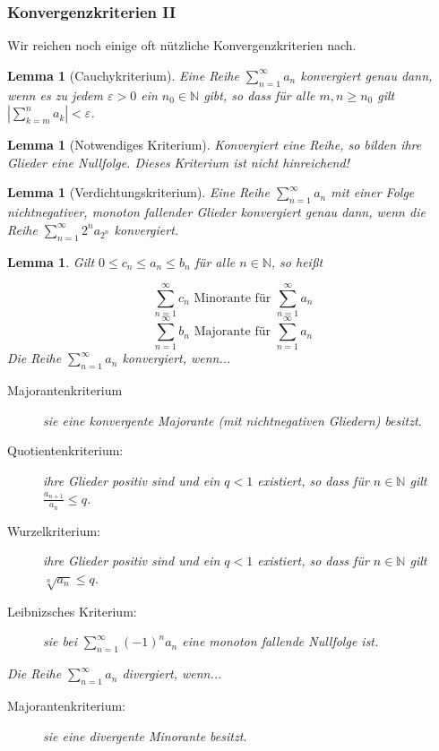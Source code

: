 \documentclass[fontsize=12pt,paper=a4,twoside,bibtotoc,idxtotoc,
liststotoc,pagesize,BCOR1.2cm,DIV15,chapterprefix,pagesize=pdftex]{scrbook}
\theoremstyle{plain}
\newtheorem{lm}[equation]{Lemma}
\theoremstyle{definition}
\theoremstyle{remark}
\begin{document}
\subsubsection{Konvergenzkriterien II}
Wir reichen noch einige oft nützliche Konvergenzkriterien nach.\\
\begin{lm}[Cauchykriterium]
Eine Reihe $\sum_{n=1}^\infty a_n$ konvergiert
                  genau dann, wenn es zu jedem $\varepsilon>0$ ein $n_0
                  \in \mathbb{N}$ gibt, so dass für alle $m,n \geq n_0$
                  gilt $| \sum_{k=m}^n a_k|<\varepsilon$.
\end{lm}
\begin{lm}[Notwendiges Kriterium] Konvergiert eine Reihe, so bilden ihre Glieder eine Nullfolge. Dieses Kriterium ist nicht hinreichend!
\end{lm}
\begin{lm}[Verdichtungskriterium] Eine Reihe $\sum_{n=1}^\infty a_n$ mit
                  einer Folge nichtnegativer, monoton fallender
                  Glieder konvergiert genau dann, wenn die Reihe
                  $\sum_{n=1}^\infty 2^n a_{2^n}$ konvergiert.
\end{lm}
\begin{lm} Gilt $0 \leq c_n \leq a_n \leq b_n$ für alle $n \in \mathbb{N}$, so heißt 

\[\sum_{n=1}^\infty c_n \text{ Minorante für } \sum_{n=1}^\infty a_n\] 
\[\sum_{n=1}^\infty b_n \text{ Majorante für } \sum_{n=1}^\infty a_n\]
Die Reihe $\sum_{n=1}^\infty a_n$ konvergiert, wenn...
\begin{description}
\item[Majorantenkriterium] sie eine konvergente Majorante (mit nichtnegativen Gliedern) besitzt.
\item[Quotientenkriterium:] ihre Glieder positiv sind und ein $q<1$
existiert, so dass für $n \in \mathbb{N}$ gilt $\frac{a_{n+1}}{a_n}
\leq q$. 
\item[Wurzelkriterium:] ihre Glieder positiv sind und ein $q<1$
existiert, so dass für $n \in \mathbb{N}$ gilt $\sqrt[n]{a_n} \leq
q$. 
\item[Leibnizsches Kriterium:] sie bei $\sum_{n=1}^\infty (-1)^n a_n$
eine monoton fallende  Nullfolge ist.
\end{description}
Die Reihe $\sum_{n=1}^\infty a_n$ divergiert, wenn...
\begin{description}
\item[Majorantenkriterium:] sie eine divergente Minorante besitzt.
\end{description}
\end{lm}
\end{document}
